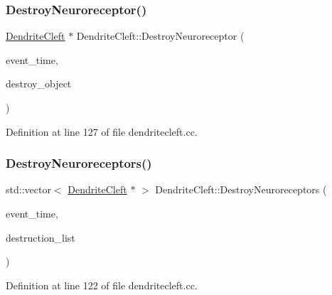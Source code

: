 \subsubsection{\texorpdfstring{Destroy\+Neuroreceptor()}{DestroyNeuroreceptor()}}
{\footnotesize\ttfamily \mbox{\hyperlink{class_dendrite_cleft}{Dendrite\+Cleft}} $\ast$ Dendrite\+Cleft\+::\+Destroy\+Neuroreceptor (\begin{DoxyParamCaption}\item[{std\+::chrono\+::time\+\_\+point$<$ \mbox{\hyperlink{universe_8h_a0ef8d951d1ca5ab3cfaf7ab4c7a6fd80}{Clock}} $>$}]{event\+\_\+time,  }\item[{\mbox{\hyperlink{class_dendrite_cleft}{Dendrite\+Cleft}} $\ast$}]{destroy\+\_\+object }\end{DoxyParamCaption})}



Definition at line 127 of file dendritecleft.\+cc.

\mbox{\label{class_dendrite_cleft_a630e00e2d1108f2a43bcac9466e4681b}} 
\subsubsection{\texorpdfstring{Destroy\+Neuroreceptors()}{DestroyNeuroreceptors()}}
{\footnotesize\ttfamily std\+::vector$<$ \mbox{\hyperlink{class_dendrite_cleft}{Dendrite\+Cleft}} $\ast$ $>$ Dendrite\+Cleft\+::\+Destroy\+Neuroreceptors (\begin{DoxyParamCaption}\item[{std\+::chrono\+::time\+\_\+point$<$ \mbox{\hyperlink{universe_8h_a0ef8d951d1ca5ab3cfaf7ab4c7a6fd80}{Clock}} $>$}]{event\+\_\+time,  }\item[{std\+::vector$<$ \mbox{\hyperlink{class_dendrite_cleft}{Dendrite\+Cleft}} $\ast$$>$}]{destruction\+\_\+list }\end{DoxyParamCaption})}



Definition at line 122 of file dendritecleft.\+cc.

\mbox{\label{class_dendrite_cleft_ac567530d9f083e1ee65d5c6484cc9fa7}} 
